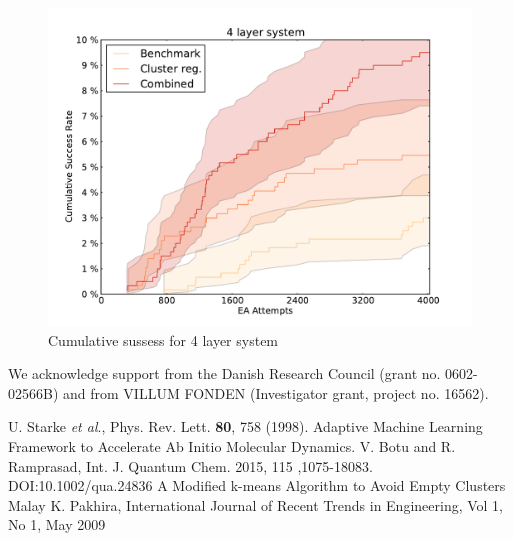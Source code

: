 \documentclass[%
 aps,
 prl,%
 amsmath,amssymb,
 reprint,%
]{revtex4-1}
\begin{document}
\begin{figure}[h]
    \centering
    \includegraphics[width=1.0\columnwidth]{4lsuccess.pdf}
    \caption{Cumulative sussess for 4 layer system}
    \label{fig:fig6}
\end{figure}



We acknowledge support from the Danish Research Council (grant no. 0602-02566B) and from VILLUM FONDEN (Investigator grant, project no. 16562).

\begin{thebibliography}{12}  
   U. Starke \textit{et al}., Phys. Rev. Lett. \textbf{80}, 758 (1998).    
   {Adaptive Machine Learning Framework to Accelerate Ab Initio Molecular Dynamics.} V. Botu and R. Ramprasad, Int. J. Quantum Chem. 2015, 115 ,1075-18083. DOI:10.1002/qua.24836    
  {A Modified k-means Algorithm to Avoid Empty Clusters} Malay K. Pakhira, International Journal of Recent Trends in Engineering, Vol 1, No 1, May 2009
 \end{thebibliography}
\end{document}
